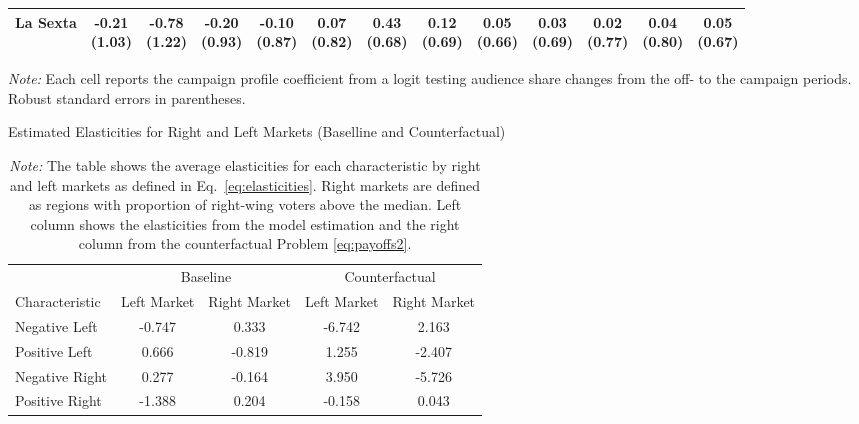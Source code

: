 \documentclass[12pt]{article}
\begin{document}
\begin{table}[!htbp]
\begin{threeparttable}
\begin{tabular}{lcccccccccc|cc}
			La Sexta & \shortstack{-0.21\\(1.03)} & \shortstack{-0.78\\(1.22)} & \shortstack{-0.20\\(0.93)} & \shortstack{-0.10\\(0.87)} & \shortstack{0.07\\(0.82)} & \shortstack{0.43\\(0.68)} & \shortstack{0.12\\(0.69)} & \shortstack{0.05\\(0.66)} & \shortstack{0.03\\(0.69)} & \shortstack{0.02\\(0.77)} & \shortstack{0.04\\(0.80)} & \shortstack{0.05\\(0.67)} \\
			\bottomrule
		\end{tabular}
		\begin{tablenotes}\footnotesize
			\item \textit{Note:} Each cell reports the campaign profile coefficient from a logit testing audience share changes from the off- to the campaign periods. Robust standard errors in parentheses. 
		\end{tablenotes}
	\end{threeparttable}
\end{table}






\begin{table}[!htb]
	\centering
	\caption{Estimated Elasticities for Right and Left Markets (Baselline and Counterfactual)}
	\begin{tabular}{l|cc|cc}
		\toprule
		& \multicolumn{2}{c|}{Baseline} & \multicolumn{2}{c}{Counterfactual} \\
		Characteristic & Left Market & Right Market & Left Market & Right Market \\
		\midrule
		Negative Left & -0.747 & 0.333 & -6.742 & 2.163 \\
		Positive Left & 0.666 & -0.819 & 1.255 & -2.407 \\
		Negative Right & 0.277 & -0.164 & 3.950 & -5.726 \\
		Positive Right & -1.388 & 0.204 & -0.158 & 0.043 \\
		\bottomrule
	\end{tabular}
	\caption*{\textit{Note:} \small The table shows the average elasticities for each characteristic by right and left markets as defined in Eq.~\eqref{eq:elasticities}. Right markets are defined as regions with proportion of right-wing voters above the median. Left column shows the elasticities from the model estimation and the right column from the counterfactual Problem \eqref{eq:payoffs2}.}
	\label{tab:elasticities_count}
\end{table}
\end{document}
